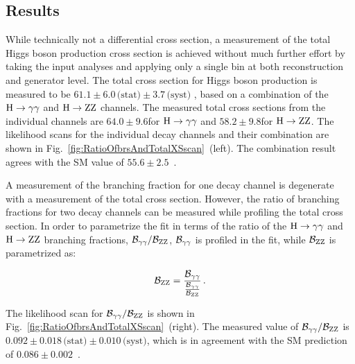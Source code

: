 \subsection{Results}
\label{sec:diffxs-results}

While technically not a differential cross section, a measurement of the total Higgs boson production cross section is achieved without much further effort by taking the input analyses and applying only a single bin at both reconstruction and generator level.
% 
The total cross section for Higgs boson production is measured to be
$61.1   \pm 6.0 \,\text{(stat)}   \pm 3.7 \,\text{(syst)}  $\pb
, based on a combination of the $\mathrm{H}\to\mathrm{\gamma}\mathrm{\gamma}$ and $\mathrm{H}\to\mathrm{Z}\mathrm{Z}$ channels.
% 
The measured total cross sections from the individual channels are $64.0\pm9.6$\pb for $\mathrm{H}\to\mathrm{\gamma}\mathrm{\gamma}$ and $58.2\pm9.8$\pb for $\mathrm{H}\to\mathrm{Z}\mathrm{Z}$.
% 
The likelihood scans for the individual decay channels and their combination are shown in Fig.~\ref{fig:RatioOfbrsAndTotalXSscan}~(left).
% 
The combination result agrees with the SM value of $55.6\pm2.5$\pb~\cite{deFlorian:2016spz}.


A measurement of the branching fraction for one decay channel is degenerate with a measurement of the total cross section.
% 
However, the ratio of branching fractions for two decay channels can be measured while profiling the total cross section.
% 
In order to parametrize the fit in terms of the ratio of the $\mathrm{H}\to\mathrm{\gamma}\mathrm{\gamma}$ and $\mathrm{H}\to\mathrm{Z}\mathrm{Z}$ branching fractions, $\mathcal{B}_{\mathrm{\gamma}\mathrm{\gamma}}/\mathcal{B}_{\mathrm{Z}\mathrm{Z}}$, $\mathcal{B}_{\mathrm{\gamma}\mathrm{\gamma}}$ is profiled in the fit, while $\mathcal{B}_{\mathrm{Z}\mathrm{Z}}$ is parametrized as:
% 
\begin{linenomath*}
\begin{equation}
\mathcal{B}_{\mathrm{Z}\mathrm{Z}} = \frac{\mathcal{B}_{\mathrm{\gamma}\mathrm{\gamma}}}{ \frac{\mathcal{B}_{\mathrm{\gamma}\mathrm{\gamma}}}{\mathcal{B}_{\mathrm{Z}\mathrm{Z}}} }
\,.
\end{equation}
\end{linenomath*}
% 
The likelihood scan for $\mathcal{B}_{\mathrm{\gamma}\mathrm{\gamma}}/\mathcal{B}_{\mathrm{Z}\mathrm{Z}}$ is shown in Fig.~\ref{fig:RatioOfbrsAndTotalXSscan}~(right).
% 
The measured value of $\mathcal{B}_{\mathrm{\gamma}\mathrm{\gamma}}/\mathcal{B}_{\mathrm{Z}\mathrm{Z}}$ is
$0.092   \pm 0.018 \,\text{(stat)}   \pm 0.010 \,\text{(syst)}  $,
which is in agreement with the SM prediction of $0.086 \pm 0.002$~\cite{deFlorian:2016spz}.


